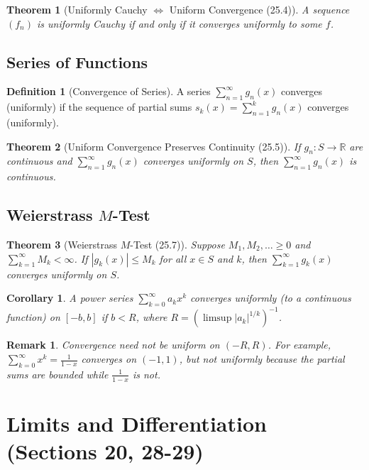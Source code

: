 \documentclass[9pt]{article}
\theoremstyle{definition}
\newtheorem{definition}{Definition}
\theoremstyle{plain}
\newtheorem{theorem}{Theorem}
\newtheorem{corollary}{Corollary}
\newtheorem{remark}{Remark}
\begin{document}
\begin{theorem}[Uniformly Cauchy \( \iff \) Uniform Convergence (25.4)]
A sequence \( (f_n) \) is uniformly Cauchy if and only if it converges uniformly to some \( f \).
\end{theorem}

\subsection*{Series of Functions}
\begin{definition}[Convergence of Series]
A series \( \sum_{n=1}^\infty g_n(x) \) converges (uniformly) if the sequence of partial sums \( s_k(x) = \sum_{n=1}^k g_n(x) \) converges (uniformly).
\end{definition}

\begin{theorem}[Uniform Convergence Preserves Continuity (25.5)]
If \( g_n : S \to \mathbb{R} \) are continuous and \( \sum_{n=1}^\infty g_n(x) \) converges uniformly on \( S \), then \( \sum_{n=1}^\infty g_n(x) \) is continuous.
\end{theorem}

\subsection*{Weierstrass \( M \)-Test}
\begin{theorem}[Weierstrass \( M \)-Test (25.7)]
Suppose \( M_1, M_2, \ldots \geq 0 \) and \( \sum_{k=1}^\infty M_k < \infty \). If \( |g_k(x)| \leq M_k \) for all \( x \in S \) and \( k \), then \( \sum_{k=1}^\infty g_k(x) \) converges uniformly on \( S \).
\end{theorem}

\begin{corollary}
A power series \( \sum_{k=0}^\infty a_k x^k \) converges uniformly (to a continuous function) on \( [-b, b] \) if \( b < R \), where \( R = (\limsup |a_k|^{1/k})^{-1} \).
\end{corollary}

\begin{remark}
Convergence need not be uniform on \( (-R, R) \). For example, \( \sum_{k=0}^\infty x^k = \frac{1}{1-x} \) converges on \( (-1, 1) \), but not uniformly because the partial sums are bounded while \( \frac{1}{1-x} \) is not.
\end{remark}
\section*{Limits and Differentiation (Sections 20, 28-29)}
\end{document}
